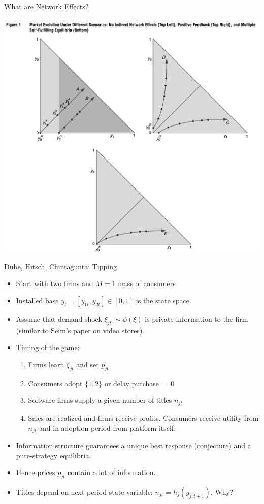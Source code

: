 \documentclass[aspectratio=169,11pt]{beamer}
\begin{document}
\begin{frame}{What are Network Effects?}
\begin{center}
\includegraphics[scale=0.5]{resources/triangles.png}
\end{center}
\end{frame}


\begin{frame}{Dube, Hitsch, Chintagunta: Tipping}

\begin{itemize}
\item Start with two firms and $M=1$ mass of consumers
\item Installed base $y_{t} = [y_{1t},y_{2t}] \in [0,1]$ is the state space.
\item Assume that demand shock $\xi_{jt}~\sim \phi(\xi)$ is private information to the firm (similar to Seim's paper on video stores).
\item Timing of the game:
\begin{enumerate}
\item Firms learn $\xi_{jt}$ and set $p_{jt}$
\item Consumers adopt $\{1,2\}$ or delay purchase $=0$
\item Software firms supply a given number of titles $n_{jt}$
\item Sales are realized and firms receive profits. Consumers receive utility from $n_{jt}$ and in adoption period from platform itself.
\end{enumerate}
\item Information structure guarantees a unique best response (conjecture) and a pure-strategy equilibria.
\item Hence prices $p_{jt}$ contain a lot of information.
\item Titles depend on next period state variable: $n_{jt} = h_j(y_{j,t+1})$. \alert{Why?}
\end{itemize}
\end{frame}
\end{document}
